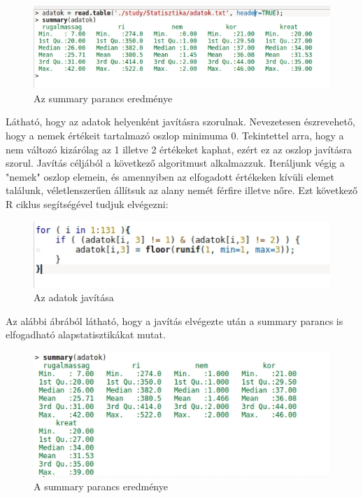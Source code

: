 \documentclass[oneside,titlepage,12pt,a4paper]{report}
\begin{document}
\begin{figure}[H]
\begin{center}
  \includegraphics[width=150mm]{./Abrak/summary.jpg}
  \caption{Az summary parancs eredménye}
\end{center}
\end{figure}

Látható, hogy az adatok helyenként javításra szorulnak. Nevezetesen észrevehető, hogy a nemek értékeit tartalmazó oszlop minimuma 0. Tekintettel arra, hogy a nem változó kizárólag az 1 illetve 2 értékeket kaphat, ezért ez az oszlop javításra szorul. Javítás céljából a következő algoritmust alkalmazzuk. Iteráljunk végig a "nemek" oszlop elemein, és amennyiben az elfogadott értékeken kívüli elemet találunk, véletlenszerűen állítsuk az alany nemét férfire illetve nőre. Ezt következő R ciklus segítségével tudjuk elvégezni: 

\begin{figure}[H]
\begin{center}
  \includegraphics[width=150mm]{./Abrak/cleanDataFunc.jpg}
  \caption{Az adatok javítása}
\end{center}
\end{figure}

Az alábbi ábrából látható, hogy a javítás elvégezte után a summary parancs is elfogadható alapstatisztikákat mutat.

\begin{figure}[H] \label{img::sum2}
\begin{center}
  \includegraphics[width=150mm]{./Abrak/cleanDataSum.jpg}
  \caption{A summary parancs eredménye}
\end{center}
\end{figure}
\end{document}
